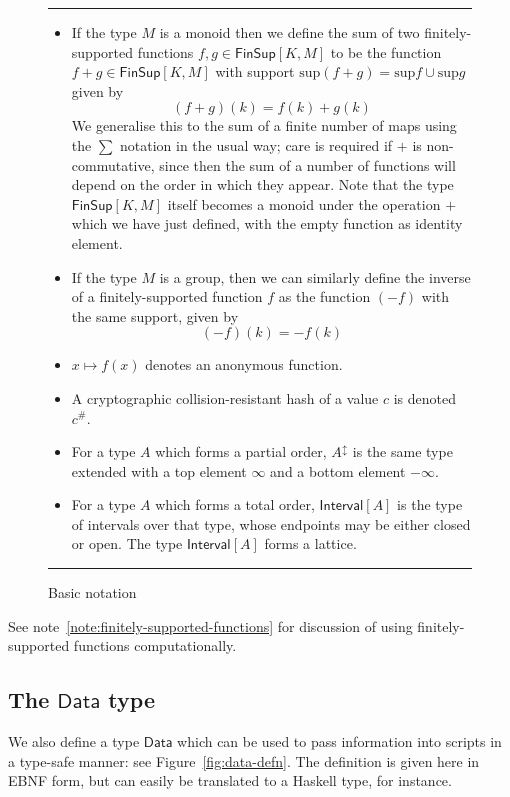 \documentclass[a4paper]{article}
\newcounter{note}
\newcommand{\s}{\textsf}  %
\newcommand\rfskip{7pt}
\newenvironment{ruledfigure}[1]{\begin{figure}[#1]\hrule\vspace{\rfskip}}{\vspace{\rfskip}\hrule\end{figure}}
\newcommand{\Interval}[1]{\ensuremath{\s{Interval}[#1]}}
\newcommand{\extended}[1]{#1^\updownarrow}
\newcommand{\FinSup}[2]{\ensuremath{\s{FinSup}[#1,#2]}}
\newcommand{\support}{\ensuremath{\mathrm{sup}}}
\newcommand{\Data}{\ensuremath{\mathsf{Data}}}
\begin{document}
\begin{ruledfigure}{H}
\begin{itemize}
  \item If the type $M$ is a monoid then we define the sum of two finitely-supported
    functions
    $f, g \in \FinSup{K}{M}$ to be the function $f+g \in \FinSup{K}{M}$ with
    support $\support (f+g) = \support f \cup \support g$ given by
    \[(f+g)(k) = f(k) + g(k) \]
    We generalise this to the sum of a finite number of maps using
    the $\sum$ notation in the usual way; care is required if
    $+$ is non-commutative, since then the sum of a number of
    functions will depend on the order in which they appear. Note that
    the type $\FinSup{K}{M}$ itself becomes a monoid under the
    operation $+$ which we have just defined, with the empty function as
    identity element.

  \item If the type $M$ is a group, then we can
    similarly define the inverse of a finitely-supported function $f$ as
    the function $(-f)$ with the same support, given by
    \[ (-f)(k) = -f(k) \]

  \item $x \mapsto f(x)$ denotes an anonymous function.

  \item A cryptographic
    collision-resistant hash of a value $c$ is denoted $c^{\#}$.

  \item For a type $A$ which forms a partial order, $\extended{A}$ is the same
    type extended with a top element $\infty$ and a bottom element $-\infty$.

  \item For a type $A$ which forms a total order,  $\Interval{A}$ is the type
    of intervals over that type, whose endpoints may be either closed or open.
    The type $\Interval{A}$ forms a lattice.

\end{itemize}
\caption{Basic notation}
\label{fig:basic-notation}
\end{ruledfigure}

See note~\ref{note:finitely-supported-functions} for discussion of using
finitely-supported functions computationally.

\subsection{The \Data{} type}
We also define a type \Data{} which can be used to pass information
into scripts in a type-safe manner: see Figure~\ref{fig:data-defn}. The
definition is given here in EBNF form, but can easily be translated to
a Haskell type, for instance.
\end{document}

